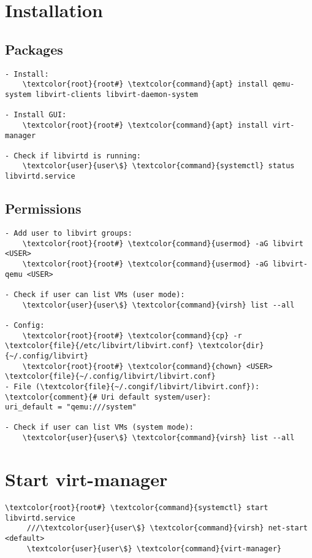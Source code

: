 \documentclass[10pt, a4paper, onecolumn, openany]{book} %
\begin{document}
\section{Installation}
\subsection{Packages}
\begin{Verbatim}[commandchars=\\\{\}]
- Install:
    \textcolor{root}{root#} \textcolor{command}{apt} install qemu-system libvirt-clients libvirt-daemon-system

- Install GUI:
    \textcolor{root}{root#} \textcolor{command}{apt} install virt-manager

- Check if libvirtd is running:
    \textcolor{user}{user\$} \textcolor{command}{systemctl} status libvirtd.service
\end{Verbatim}

\subsection{Permissions}
\begin{Verbatim}[commandchars=\\\{\}]
- Add user to libvirt groups:
    \textcolor{root}{root#} \textcolor{command}{usermod} -aG libvirt <USER>
    \textcolor{root}{root#} \textcolor{command}{usermod} -aG libvirt-qemu <USER>

- Check if user can list VMs (user mode):
    \textcolor{user}{user\$} \textcolor{command}{virsh} list --all

- Config:
    \textcolor{root}{root#} \textcolor{command}{cp} -r \textcolor{file}{/etc/libvirt/libvirt.conf} \textcolor{dir}{~/.config/libvirt}
    \textcolor{root}{root#} \textcolor{command}{chown} <USER> \textcolor{file}{~/.config/libvirt/libvirt.conf}
- File (\textcolor{file}{~/.congif/libvirt/libvirt.conf}):
\textcolor{comment}{# Uri default system/user}:
uri_default = "qemu:///system"

- Check if user can list VMs (system mode):
    \textcolor{user}{user\$} \textcolor{command}{virsh} list --all
\end{Verbatim}

\section{Start virt-manager}
\begin{Verbatim}[commandchars=\\\{\}]
     \textcolor{root}{root#} \textcolor{command}{systemctl} start libvirtd.service
     ///\textcolor{user}{user\$} \textcolor{command}{virsh} net-start <default>
     \textcolor{user}{user\$} \textcolor{command}{virt-manager}
\end{Verbatim}
\end{document}
